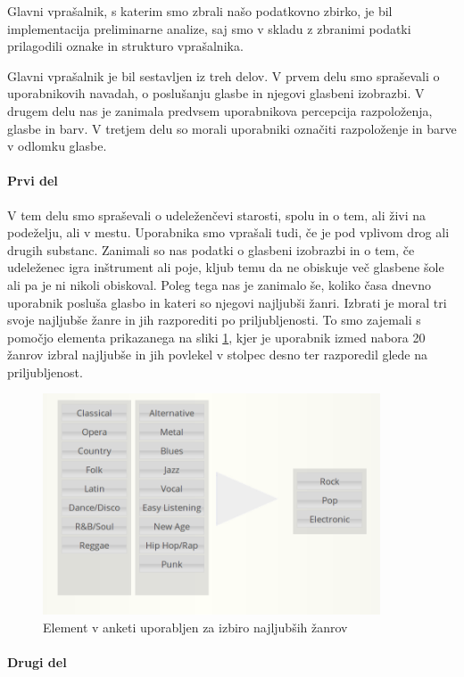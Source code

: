 \documentclass[a4paper, 12pt]{book}
\begin{document}
{Glavni vprašalnik, s katerim smo zbrali našo podatkovno zbirko, je bil implementacija preliminarne analize, saj smo v skladu z zbranimi podatki prilagodili oznake in strukturo vprašalnika.

Glavni vprašalnik je bil sestavljen iz treh delov. V prvem delu smo spraševali o uporabnikovih navadah, o poslušanju glasbe in njegovi glasbeni izobrazbi. V drugem delu nas je zanimala predvsem uporabnikova percepcija razpoloženja, glasbe in barv. V tretjem delu so morali uporabniki označiti razpoloženje in barve v odlomku glasbe. 

\paragraph{Prvi del}

V tem delu smo spraševali o udeleženčevi starosti, spolu in o tem, ali živi na podeželju, ali v mestu.  Uporabnika smo vprašali tudi, če je pod vplivom drog ali drugih substanc. Zanimali so nas podatki o glasbeni izobrazbi in o tem, če udeleženec igra inštrument ali poje, kljub temu da ne obiskuje več glasbene šole ali pa je ni nikoli obiskoval. Poleg tega nas je zanimalo še, koliko časa dnevno uporabnik posluša glasbo in kateri so njegovi najljubši žanri. Izbrati je moral tri svoje najljubše žanre in jih razporediti po priljubljenosti. To smo zajemali s pomočjo elementa prikazanega na sliki \ref{genresel}, kjer je uporabnik izmed nabora 20 žanrov izbral najljubše in jih povlekel v stolpec desno ter razporedil glede na priljubljenost. 

\begin{figure}[h!t]
\centering
\includegraphics[width=10cm]{genresel.png}

\caption{Element v anketi uporabljen za izbiro najljubših žanrov}
\label{genresel}
\end{figure}

\paragraph{Drugi del}
\label{ank2del}

}
\end{document}
